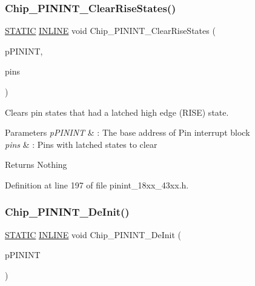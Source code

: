 \subsubsection{\texorpdfstring{Chip\+\_\+\+P\+I\+N\+I\+N\+T\+\_\+\+Clear\+Rise\+States()}{Chip\_PININT\_ClearRiseStates()}}
{\footnotesize\ttfamily \hyperlink{group___l_p_c___types___public___macros_ga10b2d890d871e1489bb02b7e70d9bdfb}{S\+T\+A\+T\+IC} \hyperlink{spifi__18xx__43xx_8h_a2eb6f9e0395b47b8d5e3eeae4fe0c116}{I\+N\+L\+I\+NE} void Chip\+\_\+\+P\+I\+N\+I\+N\+T\+\_\+\+Clear\+Rise\+States (\begin{DoxyParamCaption}\item[{\hyperlink{struct_l_p_c___p_i_n___i_n_t___t}{L\+P\+C\+\_\+\+P\+I\+N\+\_\+\+I\+N\+T\+\_\+T} $\ast$}]{p\+P\+I\+N\+I\+NT,  }\item[{uint32\+\_\+t}]{pins }\end{DoxyParamCaption})}



Clears pin states that had a latched high edge (R\+I\+SE) state. 


\begin{DoxyParams}{Parameters}
{\em p\+P\+I\+N\+I\+NT} & \+: The base address of Pin interrupt block \\
\hline
{\em pins} & \+: Pins with latched states to clear \\
\hline
\end{DoxyParams}
\begin{DoxyReturn}{Returns}
Nothing 
\end{DoxyReturn}


Definition at line 197 of file pinint\+\_\+18xx\+\_\+43xx.\+h.

\mbox{\label{group___p_i_n_i_n_t__18_x_x__43_x_x_gaffd71b90ad59df213ae6ce90a4687727}} 
\subsubsection{\texorpdfstring{Chip\+\_\+\+P\+I\+N\+I\+N\+T\+\_\+\+De\+Init()}{Chip\_PININT\_DeInit()}}
{\footnotesize\ttfamily \hyperlink{group___l_p_c___types___public___macros_ga10b2d890d871e1489bb02b7e70d9bdfb}{S\+T\+A\+T\+IC} \hyperlink{spifi__18xx__43xx_8h_a2eb6f9e0395b47b8d5e3eeae4fe0c116}{I\+N\+L\+I\+NE} void Chip\+\_\+\+P\+I\+N\+I\+N\+T\+\_\+\+De\+Init (\begin{DoxyParamCaption}\item[{\hyperlink{struct_l_p_c___p_i_n___i_n_t___t}{L\+P\+C\+\_\+\+P\+I\+N\+\_\+\+I\+N\+T\+\_\+T} $\ast$}]{p\+P\+I\+N\+I\+NT }\end{DoxyParamCaption})}



